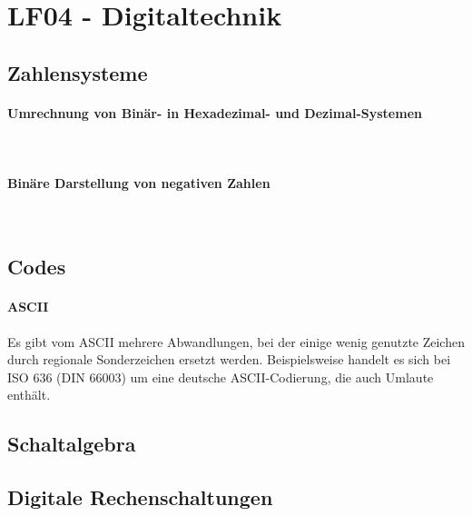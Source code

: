\section{LF04 - Digitaltechnik}
%
\subsection{Zahlensysteme}

\paragraph{Umrechnung von Binär- in Hexadezimal- und Dezimal-Systemen}~\\
\paragraph{Binäre Darstellung von negativen Zahlen}~\\


\subsection{Codes}

\paragraph{ASCII}
Es gibt vom ASCII mehrere Abwandlungen, bei der einige wenig genutzte Zeichen durch regionale Sonderzeichen ersetzt werden. Beispielsweise handelt es sich bei ISO 636 (DIN 66003) um eine deutsche ASCII-Codierung, die auch Umlaute enthält.

\subsection{Schaltalgebra}
\subsection{Digitale Rechenschaltungen}